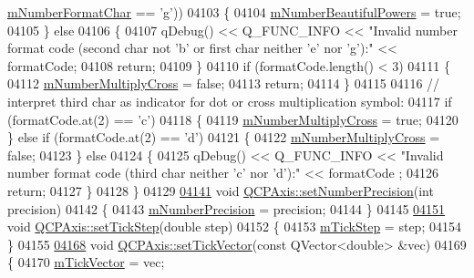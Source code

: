 \begin{DoxyCode}
      \hyperlink{a00025_a600d56365316ea783927f7d595f1ed54}{mNumberFormatChar} == \textcolor{charliteral}{'g'}))
04103   \{
04104     \hyperlink{a00025_af03809bee3f3e35fcc38d25b6dd5003b}{mNumberBeautifulPowers} = \textcolor{keyword}{true};
04105   \} \textcolor{keywordflow}{else}
04106   \{
04107     qDebug() << Q\_FUNC\_INFO << \textcolor{stringliteral}{"Invalid number format code (second char not 'b' or first char neither 'e'
       nor 'g'):"} << formatCode;
04108     \textcolor{keywordflow}{return};
04109   \}
04110   \textcolor{keywordflow}{if} (formatCode.length() < 3)
04111   \{
04112     \hyperlink{a00025_aebf0367d8645d2e05b93a0952b7e805b}{mNumberMultiplyCross} = \textcolor{keyword}{false};
04113     \textcolor{keywordflow}{return};
04114   \}
04115   
04116   \textcolor{comment}{// interpret third char as indicator for dot or cross multiplication symbol:}
04117   \textcolor{keywordflow}{if} (formatCode.at(2) == \textcolor{charliteral}{'c'})
04118   \{
04119     \hyperlink{a00025_aebf0367d8645d2e05b93a0952b7e805b}{mNumberMultiplyCross} = \textcolor{keyword}{true};
04120   \} \textcolor{keywordflow}{else} \textcolor{keywordflow}{if} (formatCode.at(2) == \textcolor{charliteral}{'d'})
04121   \{
04122     \hyperlink{a00025_aebf0367d8645d2e05b93a0952b7e805b}{mNumberMultiplyCross} = \textcolor{keyword}{false};
04123   \} \textcolor{keywordflow}{else}
04124   \{
04125     qDebug() << Q\_FUNC\_INFO << \textcolor{stringliteral}{"Invalid number format code (third char neither 'c' nor 'd'):"} << formatCode
      ;
04126     \textcolor{keywordflow}{return};
04127   \}
04128 \}
04129 
\hypertarget{a00115_source_l04141}{}\hyperlink{a00025_a21dc8023ad7500382ad9574b48137e63}{04141} \textcolor{keywordtype}{void} \hyperlink{a00025_a21dc8023ad7500382ad9574b48137e63}{QCPAxis::setNumberPrecision}(\textcolor{keywordtype}{int} precision)
04142 \{
04143   \hyperlink{a00025_acd76e8c783384d99ccc4a13797eec188}{mNumberPrecision} = precision;
04144 \}
04145 
\hypertarget{a00115_source_l04151}{}\hyperlink{a00025_af727db0acc6492c4c774c0700e738205}{04151} \textcolor{keywordtype}{void} \hyperlink{a00025_af727db0acc6492c4c774c0700e738205}{QCPAxis::setTickStep}(\textcolor{keywordtype}{double} step)
04152 \{
04153   \hyperlink{a00025_a4fe96830fc5a2711e20fe5edccfe2ed3}{mTickStep} = step;
04154 \}
04155 
\hypertarget{a00115_source_l04168}{}\hyperlink{a00025_a871db94c5d796c80fcbe1a9d4506e27e}{04168} \textcolor{keywordtype}{void} \hyperlink{a00025_a871db94c5d796c80fcbe1a9d4506e27e}{QCPAxis::setTickVector}(\textcolor{keyword}{const} QVector<double> &vec)
04169 \{
04170   \hyperlink{a00025_aae0f9b9973b85be601200f00f5825087}{mTickVector} = vec;

\end{DoxyCode}
